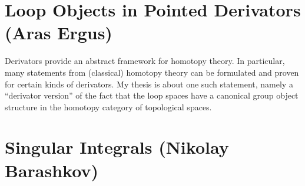 \section{Loop Objects in Pointed Derivators (Aras Ergus)}

Derivators provide an abstract framework for homotopy
theory. In particular, many statements from (classical) homotopy theory
can be formulated and proven for certain kinds of derivators. My thesis
is about one such statement, namely a ``derivator version'' of the fact that
the loop spaces have a canonical group object structure in the homotopy
category of topological spaces.

\section{Singular Integrals (Nikolay Barashkov)}

\ 
